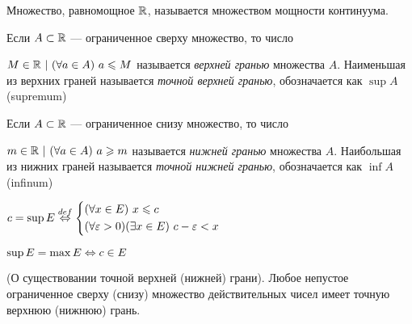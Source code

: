 \begin{definition}
    Множество, равномощное $\mathbb{R}$, называется множеством мощности
    континуума.
\end{definition}

\begin{definition}
    Если $A \subset \mathbb{R}$ --- ограниченное сверху множество, то число

    $M \in \mathbb{R}\ |\ (\forall a \in A)\ a \leqslant M$ называется \textit{верхней гранью} множества $A$.
    Наименьшая из верхних граней называется 
    \textit{точной верхней гранью}, обозначается как $\sup A$
    (supremum)
\end{definition}

\begin{definition}
    Если $A \subset \mathbb{R}$ --- ограниченное снизу множество, то число
    
    $m \in \mathbb{R}\ |\ (\forall a \in A)\ a \geqslant m$ называется \textit{нижней гранью} множества $A$.
    Наибольшая из нижних граней называется \textit{точной нижней гранью},
    обозначается как $\inf A$ (infinum)
\end{definition}

\begin{definition}
    $c = \sup E \overset{def}{\Leftrightarrow} 
    \left\{\begin{aligned}
    &(\forall x \in E)\ x \leqslant c 
    \\ 
    &(\forall \varepsilon > 0)(\exists x \in E)\ c - \varepsilon < x\end{aligned}\right.
    $

    $\sup E = \max E \Leftrightarrow c \in E$
\end{definition}

\begin{theorem} (О существовании точной верхней (нижней) грани).
    Любое непустое ограниченное сверху (снизу) множество действительных чисел имеет точную верхнюю (нижнюю) грань.
\end{theorem}

